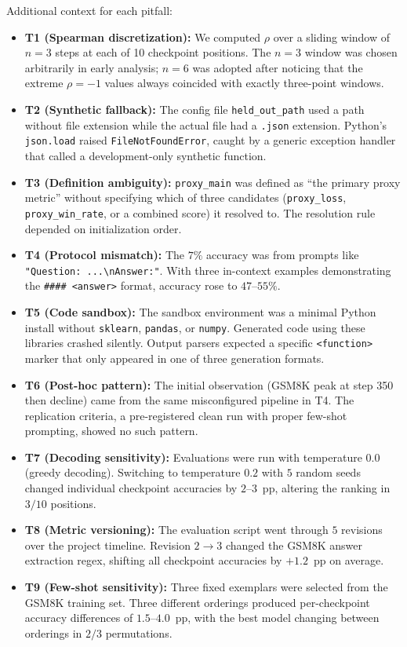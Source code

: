 \documentclass[pdflatex,sn-mathphys-ay,oneside]{sn-jnl}
\theoremstyle{thmstylethree}
\begin{document}
Additional context for each pitfall:
\begin{itemize}
    \item \textbf{T1 (Spearman discretization):} We computed $\rho$ over a sliding window of $n=3$ steps at each of 10 checkpoint positions. The $n=3$ window was chosen arbitrarily in early analysis; $n=6$ was adopted after noticing that the extreme $\rho=-1$ values always coincided with exactly three-point windows.
    \item \textbf{T2 (Synthetic fallback):} The config file \texttt{held\_out\_path} used a path without file extension while the actual file had a \texttt{.json} extension. Python's \texttt{json.load} raised \texttt{FileNotFoundError}, caught by a generic exception handler that called a development-only synthetic function.
    \item \textbf{T3 (Definition ambiguity):} \texttt{proxy\_main} was defined as ``the primary proxy metric'' without specifying which of three candidates (\texttt{proxy\_loss}, \texttt{proxy\_win\_rate}, or a combined score) it resolved to. The resolution rule depended on initialization order.
    \item \textbf{T4 (Protocol mismatch):} The $7\%$ accuracy was from prompts like \texttt{"Question: ...\textbackslash nAnswer:"}. With three in-context examples demonstrating the \texttt{\#\#\#\# <answer>} format, accuracy rose to $47$--$55\%$.
    \item \textbf{T5 (Code sandbox):} The sandbox environment was a minimal Python install without \texttt{sklearn}, \texttt{pandas}, or \texttt{numpy}. Generated code using these libraries crashed silently. Output parsers expected a specific \texttt{<function>} marker that only appeared in one of three generation formats.
    \item \textbf{T6 (Post-hoc pattern):} The initial observation (GSM8K peak at step 350 then decline) came from the same misconfigured pipeline in T4. The replication criteria, a pre-registered clean run with proper few-shot prompting, showed no such pattern.
    \item \textbf{T7 (Decoding sensitivity):} Evaluations were run with temperature $0.0$ (greedy decoding). Switching to temperature $0.2$ with $5$ random seeds changed individual checkpoint accuracies by $2$--$3$~pp, altering the ranking in $3/10$ positions.
    \item \textbf{T8 (Metric versioning):} The evaluation script went through $5$ revisions over the project timeline. Revision $2\to3$ changed the GSM8K answer extraction regex, shifting all checkpoint accuracies by $+1.2$~pp on average.
    \item \textbf{T9 (Few-shot sensitivity):} Three fixed exemplars were selected from the GSM8K training set. Three different orderings produced per-checkpoint accuracy differences of $1.5$--$4.0$~pp, with the best model changing between orderings in $2/3$ permutations.
\end{itemize}
\end{document}
